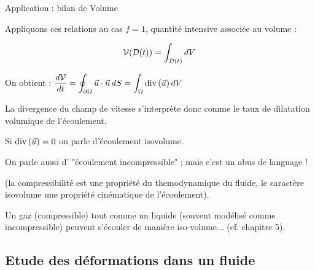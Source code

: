 \begin{frame}{Application : bilan de Volume} 
\small

\bigskip
Appliquons ces relations au cas $f=1$, quantité intensive associée au volume : 

$$ 
{\cal V}({ \cal D}(t))  =  \int_{{\cal D}(t)}   d V
$$


\pause
\bigskip

 On obtient :
\smallskip
$	
\displaystyle \frac{d \mathcal{V}}{dt} = \oint_{\partial\Omega} \vec{u}\cdot\vec{n}\, dS = 
\int_\Omega  \mbox{\rm div}\, (\vec{u})  \, dV
$

\pause
\medskip
La divergence du champ de vitesse s'interprète donc comme le \textcolor{rouge}{taux de dilatation volumique de l'écoulement}.

\pause
\medskip

Si $\mbox{\rm div}\, (\vec{u}) = 0$ on parle d'\textcolor{rouge}{écoulement isovolume}.

\smallskip

On parle aussi d' "écoulement incompressible" ; mais c'est un abus de language !  

{\tiny (la compressibilité est une propriété du themodynamique du fluide, le caractère isovolume une propriété cinématique de l'écoulement). 
}
\pause
\medskip

Un gaz (compressible) tout comme un liquide (souvent modélisé comme incompressible) peuvent s'écouler de manière iso-volume... (cf. chapitre 5).


\end{frame}





  



\subsection{Etude des déformations dans un fluide}

